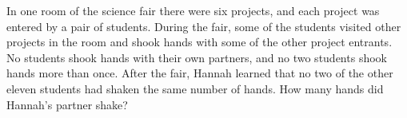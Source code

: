 In one room of the science fair there were six projects, and each project was entered by a pair of students. During the fair, some of the students visited other projects in the room and shook hands with some of the other project entrants. No students shook hands with their own partners, and no two students shook hands more than once. After the fair, Hannah learned that no two of the other eleven students had shaken the same number of hands. How many hands did Hannah's partner shake?
